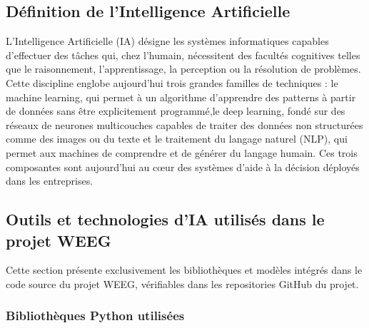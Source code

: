 \documentclass[a4paper,12pt]{report}
\begin{document}
\subsection{Définition de l'Intelligence Artificielle}

L'Intelligence Artificielle (IA) désigne les systèmes informatiques capables
d'effectuer des tâches qui, chez l'humain, nécessitent des facultés cognitives
telles que le raisonnement, l'apprentissage, la perception ou la résolution de
problèmes. Cette discipline englobe aujourd'hui trois grandes familles de
techniques : le machine learning, qui permet à un algorithme d'apprendre des patterns à partir de données sans être explicitement programmé,le deep learning, fondé sur des réseaux de neurones multicouches capables de traiter
des données non structurées comme des images ou du texte et le traitement du
langage naturel (NLP), qui permet aux machines de comprendre et de générer du
langage humain. Ces trois composantes sont aujourd'hui au cœur des systèmes
d'aide à la décision déployés dans les entreprises.

\subsection{Outils et technologies d'IA utilisés dans le projet WEEG}

Cette section présente exclusivement les bibliothèques et modèles intégrés dans
le code source du projet WEEG, vérifiables dans les repositories GitHub du projet.

\subsubsection{Bibliothèques Python utilisées}
\end{document}
